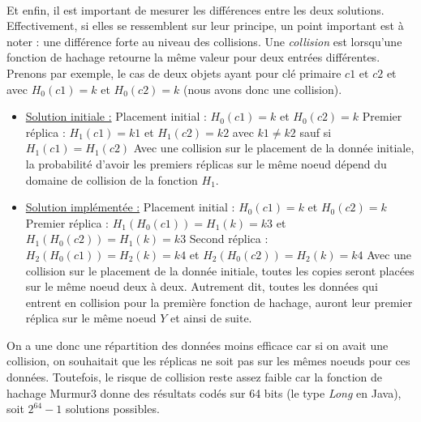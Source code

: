 \documentclass[12pt]{article}
\begin{document}
\paragraph{}Et enfin, il est important de mesurer les différences entre les deux solutions. Effectivement, si elles se ressemblent sur leur principe, un point important est à noter : une différence forte au niveau des collisions. Une \textit{collision} est lorsqu'une fonction de hachage retourne la même valeur pour deux entrées différentes. \newline
Prenons par exemple, le cas de deux objets ayant pour clé primaire $c1$ et $c2$ et avec $ H_0 (c1) = k $ et $ H_0 (c2) = k $ (nous avons donc une collision).
\begin{itemize}
    \item \underline{Solution initiale :} \newline
        Placement initial : $ H_0 (c1) = k $ et $ H_0 (c2) = k $ \newline
        Premier réplica : $ H_1 (c1) = k1 $ et $ H_1 (c2) = k2 $ avec $ k1 \neq k2 $ sauf si $ H_1 (c1) = H_1 (c2) $ \newline 
        Avec une collision sur le placement de la donnée initiale, la probabilité d'avoir les premiers réplicas sur le même noeud dépend du domaine de collision de la fonction $ H_1 $.


    \item \underline{Solution implémentée :} \newline
        Placement initial : $ H_0 (c1) = k $ et $ H_0 (c2) = k $ \newline
        Premier réplica : $ H_1 (H_0 (c1)) = H_1(k) = k3 $ et $ H_1 (H_0 (c2)) = H_1(k) = k3 $ \newline
        Second réplica : $ H_2 (H_0 (c1)) = H_2 (k) = k4 $ et $ H_2 (H_0 (c2)) = H_2 (k) = k4 $ \newline
        Avec une collision sur le placement de la donnée initiale, toutes les copies seront placées sur le même noeud deux à deux. \newline
        Autrement dit, toutes les données qui entrent en collision pour la première fonction de hachage, auront leur premier réplica sur le même noeud $Y$ et ainsi de suite.

\end{itemize}

On a une donc une répartition des données moins efficace car si on avait une collision, on souhaitait que les réplicas ne soit pas sur les mêmes noeuds pour ces données. Toutefois, le risque de collision reste assez faible car la fonction de hachage Murmur3 donne des résultats codés sur 64 bits (le type \textit{Long} en Java), soit $2^{64}-1$ solutions possibles.
\end{document}
